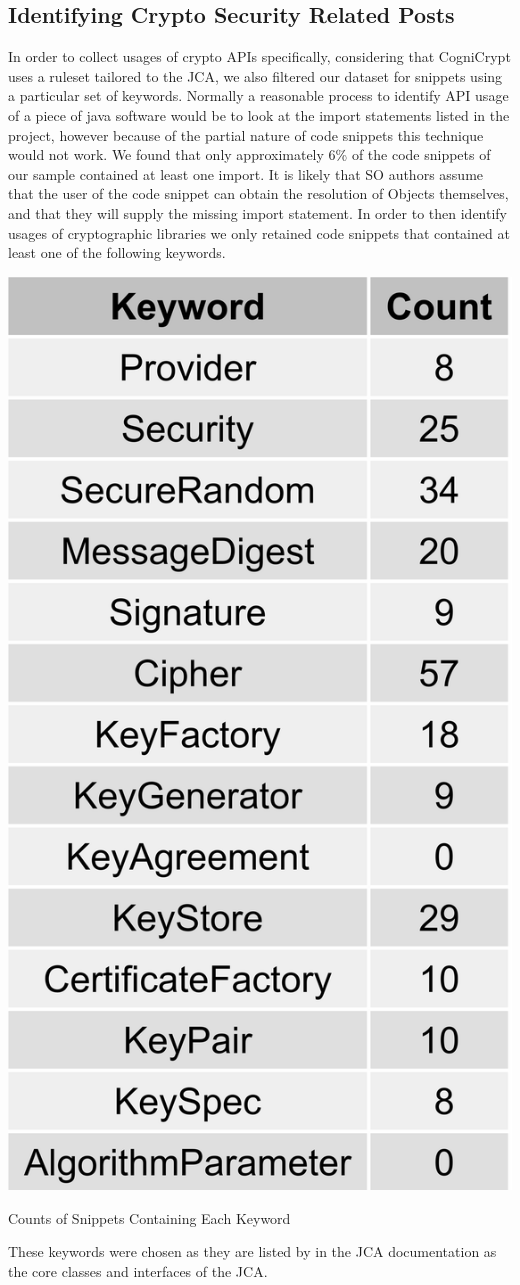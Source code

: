 \documentclass[10pt, conference]{IEEEtran}
\begin{document}
\subsection{Identifying Crypto Security Related Posts}
In order to collect usages of crypto APIs specifically, considering that CogniCrypt uses a ruleset tailored to the JCA, we also filtered our dataset for snippets using a particular set of keywords. 
Normally a reasonable process to identify API usage of a piece of java software would be to look at the import statements listed in the project, however because of the partial nature of code snippets this technique would not work. We found that only approximately 6\% of the code snippets of our sample contained at least one import. It is likely that SO authors assume that the user of the code snippet can obtain the resolution of Objects themselves, and that they will supply the missing import statement.
In order to then identify usages of cryptographic libraries we only retained code snippets that contained at least one of the following keywords.

\begin{table}[h]
\begin{center}
\includegraphics[width=0.5\linewidth]{KeywordCounts.png}
\caption{Counts of Snippets Containing Each Keyword}
\end{center}
\end{table}

These keywords were chosen as they are listed by in the JCA documentation \cite{JCA} as the core classes and interfaces of the JCA.
\end{document}
